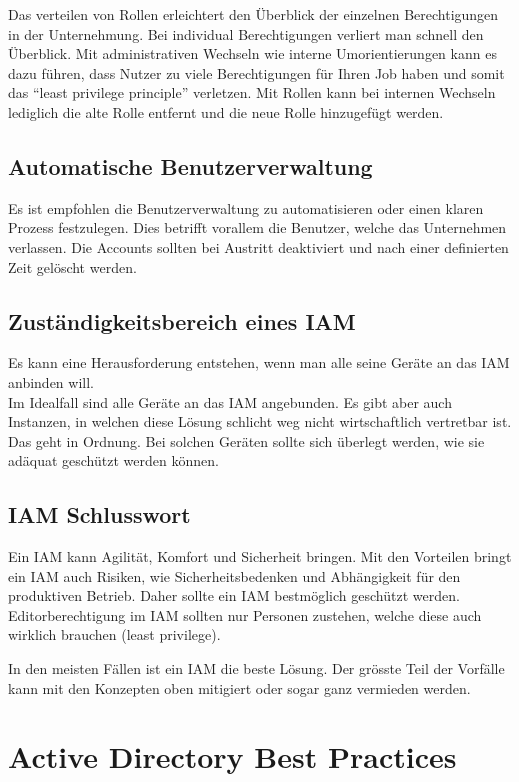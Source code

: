 Das verteilen von Rollen erleichtert den Überblick der einzelnen Berechtigungen in der Unternehmung.
Bei individual Berechtigungen verliert man schnell den Überblick.
Mit administrativen Wechseln wie interne Umorientierungen kann es dazu führen, dass Nutzer zu viele Berechtigungen für Ihren Job haben und somit das ``least privilege principle'' verletzen.
Mit Rollen kann bei internen Wechseln lediglich die alte Rolle entfernt und die neue Rolle hinzugefügt werden.


\subsection{Automatische Benutzerverwaltung}
Es ist empfohlen die Benutzerverwaltung zu automatisieren oder einen klaren Prozess festzulegen.
Dies betrifft vorallem die Benutzer, welche das Unternehmen verlassen.
Die Accounts sollten bei Austritt deaktiviert und nach einer definierten Zeit gelöscht werden.


\subsection{Zuständigkeitsbereich eines IAM}
Es kann eine Herausforderung entstehen, wenn man alle seine Geräte an das IAM anbinden will.\\

Im Idealfall sind alle Geräte an das IAM angebunden.
Es gibt aber auch Instanzen, in welchen diese Lösung schlicht weg nicht wirtschaftlich vertretbar ist.
Das geht in Ordnung.
Bei solchen Geräten sollte sich überlegt werden, wie sie adäquat geschützt werden können.

\subsection{IAM Schlusswort}
Ein IAM kann Agilität, Komfort und Sicherheit bringen.
Mit den Vorteilen bringt ein IAM auch Risiken, wie Sicherheitsbedenken und Abhängigkeit für den produktiven Betrieb.
Daher sollte ein IAM bestmöglich geschützt werden.
Editorberechtigung im IAM sollten nur Personen zustehen, welche diese auch wirklich brauchen (least privilege).

In den meisten Fällen ist ein IAM die beste Lösung.
Der grösste Teil der Vorfälle kann mit den Konzepten oben mitigiert oder sogar ganz vermieden werden.


\section{Active Directory Best Practices}
